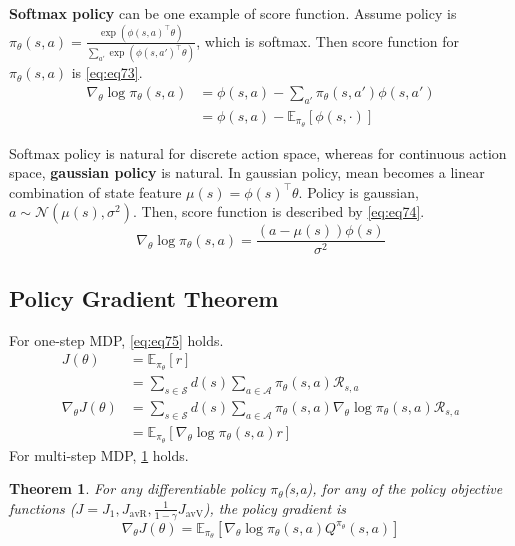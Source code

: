 \documentclass[
	10pt, %
]{article}
\newtheorem{theorem}{Theorem}[section]
\theoremstyle{plain}
\newcommand{\mbb}[1]{\mathbb{#1}}
\newcommand{\mc}[1]{\mathcal{#1}}
\newcommand{\tb}[1]{\textbf{#1}}
\newcommand{\ti}[1]{\textit{#1}}
\numberwithin{equation}{subsection} %
\begin{document}
\tb{Softmax policy} can be one example of score function. 
Assume policy is $\pi_\theta(s,a) = \frac{\exp(\phi(s,a)^\top \theta)}{\sum_{a'}\exp(\phi(s,a')^\top \theta)}$, which is softmax.
Then score function for $\pi_\theta(s,a)$ is \cref{eq:eq73}.
\begin{equation} \label{eq:eq73}
    \begin{aligned}
    \nabla_\theta \log \pi_\theta(s,a) &= \phi(s,a) - \sum_{a'}\pi_\theta(s,a')\phi(s,a') \\
    &= \phi(s,a) - \mbb{E}_{\pi_\theta}[\phi(s, \cdot)]
    \end{aligned}
\end{equation}

Softmax policy is natural for discrete action space, whereas for continuous action space, \tb{gaussian policy} is natural.
In gaussian policy, mean becomes a linear combination of state feature $\mu(s) = \phi(s)^\top \theta$. Policy is gaussian, $a \sim \mc{N}(\mu(s), \sigma^2)$. Then, score function is described by \cref{eq:eq74}.
\begin{equation} \label{eq:eq74}
    \nabla_\theta \log \pi_\theta(s,a) = \frac{(a - \mu(s))
    \phi(s)}{\sigma^2}
\end{equation}

\subsection{Policy Gradient Theorem}
For one-step MDP, \cref{eq:eq75} holds.
\begin{equation} \label{eq:eq75}
    \begin{aligned}
        J(\theta) &= \mbb{E}_{\pi_\theta}[r] \\
        &=\sum_{s \in \mc{S}}d(s)\sum_{a \in \mc{A}} \pi_\theta(s,a)\mc{R}_{s,a}\\
        \nabla_\theta J(\theta) &= \sum_{s \in \mc{S}} d(s) \sum_{a \in \mc{A}} \pi_\theta(s,a) \nabla_\theta \log \pi_\theta(s,a)\mc{R}_{s,a} \\
        &=\mbb{E}_{\pi_\theta}[\nabla_\theta \log \pi_\theta(s,a)r]
    \end{aligned}
\end{equation}
For multi-step MDP, \cref{thm:thm3} holds.
\begin{theorem} \label{thm:thm3}
    For any \ti{differentiable policy} $\pi_\theta$(s,a),
    for any of the policy objective functions ($J = J_1, J_\text{avR},\frac{1}{1-\gamma}J_\text{avV}$), the policy gradient is
    $$\nabla_\theta J(\theta) = \mbb{E}_{\pi_\theta}[\nabla_\theta \log \pi_\theta (s,a) Q^{\pi_\theta}(s,a)]$$
\end{theorem}
\end{document}
